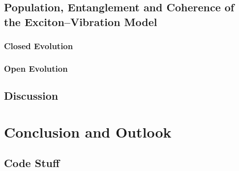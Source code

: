 \documentclass[12pt]{article}
\begin{document}
\subsection{Population, Entanglement and Coherence of the Exciton--Vibration Model}
\subsubsection{Closed Evolution}
\subsubsection{Open Evolution}
\subsection{Discussion}




































\newpage
\section{Conclusion and Outlook}











































\begin{appendices}
    \section{Code Stuff}
\end{appendices}
\newpage

 
 
\end{document}
